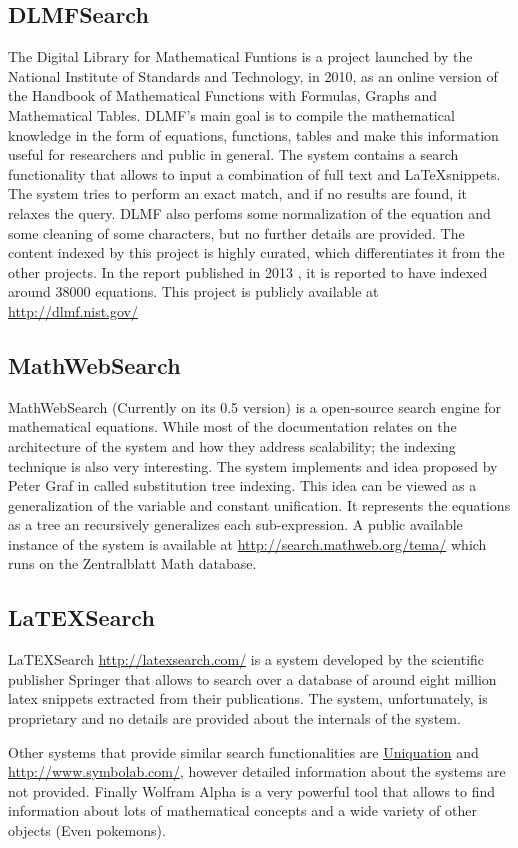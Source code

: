 \subsection{DLMFSearch}
The Digital Library for Mathematical Funtions \cite{dlmf} is a project launched by the National Institute of Standards and Technology, in 2010, as an online version of the  Handbook of Mathematical Functions with Formulas, Graphs and Mathematical Tables\cite{handbook}. DLMF's main goal is to compile the mathematical knowledge in the form of equations, functions, tables and make this information useful for researchers and public in general. The system contains a search functionality that allows to input a combination of full text and \LaTeX snippets. The system tries to perform an exact match, and if no results are found, it relaxes the query. DLMF also perfoms some normalization of the equation and some cleaning of some characters, but no further details are provided. The content indexed by this project is highly curated, which differentiates it from the other projects. In the report published in 2013 \cite{dlmf2}, it is reported to have indexed around 38000 equations. This project is publicly available at \url{http://dlmf.nist.gov/}

\subsection{MathWebSearch}
MathWebSearch\cite{mathwebsearch} (Currently on its 0.5 version) is a open-source search engine for mathematical equations. While most of the documentation relates on the architecture of the system and how they address scalability; the indexing technique is also very interesting. The system implements and idea proposed by Peter Graf in \cite{substitution_tree_indexing} called substitution tree indexing. This idea can be viewed as a generalization of the variable and constant unification. It represents the equations as a tree an recursively generalizes each sub-expression. A public available instance of the system is available at \url{http://search.mathweb.org/tema/} which runs on the Zentralblatt Math database\cite{zb}.


\subsection{LaTEXSearch}
LaTEXSearch \url{http://latexsearch.com/} is a system developed by the scientific publisher Springer that allows to search over a database of around eight million latex snippets extracted from their publications. The system, unfortunately, is proprietary and no details are provided about the internals of the system.

Other systems that provide similar search functionalities are \url{Uniquation} and \url{http://www.symbolab.com/}, however detailed information about the systems are not provided. Finally Wolfram Alpha\cite{wolframalpha} is a very powerful tool that allows to find information about lots of mathematical concepts and a wide variety of other objects (Even pokemons).
